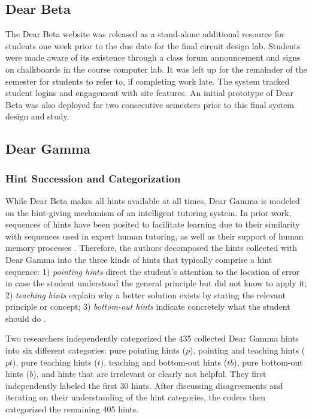 \subsection{Dear Beta}
The Dear Beta website was released as a stand-alone additional resource for students one week prior to the due date for the final circuit design lab. Students were made aware of its existence through a class forum announcement and signs on chalkboards in the course computer lab. It was left up for the remainder of the semester for students to refer to, if completing work late. The system tracked student logins and engagement with site features. An initial prototype of Dear Beta was also deployed for two consecutive semesters prior to this final system design and study.

\subsection{Dear Gamma}

\subsubsection{Hint Succession and Categorization}

While Dear Beta makes all hints available at all times, Dear Gamma is modeled on the hint-giving mechanism of an intelligent tutoring system. In prior work, sequences of hints have been posited to facilitate learning due to their similarity with sequences used in expert human tutoring, as well as their support of human memory processes \cite{sottilare2014design}. Therefore, the authors decomposed the hints collected with Dear Gamma into the three kinds of hints that typically comprise a hint sequence: 1) \textit{pointing hints} direct the student's attention to the location of error in case the student understood the general principle but did not know to apply it; 2) \textit{teaching hints} explain why a better solution exists by stating the relevant principle or concept; 3) \textit{bottom-out hints} indicate concretely what the student should do \cite{andes}. 

Two researchers independently categorized the 435 collected Dear Gamma hints into six different categories: pure pointing hints ($p$), pointing and teaching hints ($pt$), pure teaching hints ($t$), teaching and bottom-out hints ($tb$), pure bottom-out hints ($b$), and hints that are irrelevant or clearly not helpful. They first independently labeled the first 30 hints. After discussing disagreements and iterating on their understanding of the hint categories, the coders then categorized the remaining 405 hints. 

